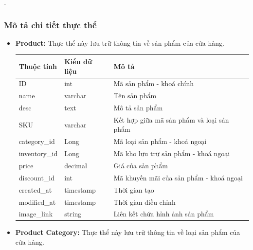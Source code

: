 \begin {list} {-}{}
\subsubsection {Mô tả chi tiết thực thể}
\begin{itemize}
    \item \textbf{Product:} Thực thể này lưu trữ thông tin về sản phẩm của cửa hàng.
        \begin{table}[h]
        \begin{tabular}{|l|l|l|}
        \hline
        \textbf{Thuộc tính} & \textbf{Kiểu dữ liệu} & \textbf{Mô tả}                            \\ \hline
        ID                  & int                   & Mã sản phẩm - khoá chính                  \\ \hline
        name                & varchar               & Tên sản phẩm                              \\ \hline
        desc                & text                  & Mô tả sản phẩm                            \\ \hline
        SKU                 & varchar               & Kết hợp giữa mã sản phẩm và loại sản phẩm \\ \hline
        category\_id        & Long                  & Mã loại sản phẩm - khoá ngoại             \\ \hline
        inventory\_id       & Long                  & Mã kho lưu trữ sản phẩm - khoá ngoại      \\ \hline
        price               & decimal               & Giá của sản phẩm                          \\ \hline
        discount\_id        & int                   & Mã khuyến mãi của sản phẩm - khoá ngoại   \\ \hline
        created\_at         & timestamp             & Thời gian tạo                             \\ \hline
        modified\_at        & timestamp             & Thời gian điều chỉnh                      \\ \hline
        image\_link         & string                & Liên kết chứa hỉnh ảnh sản phẩm           \\ \hline
        \end{tabular}
        \end{table}
    \item \textbf{Product Category:} Thực thể này lưu trữ thông tin về loại sản phẩm của cửa hàng.
            \begin{table}[h]

\end{table}
\end{itemize}
\end{list}
